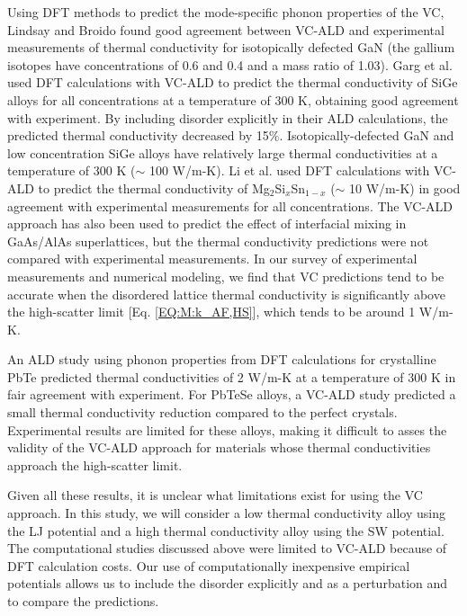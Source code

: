 Using DFT methods to predict 
the mode-specific phonon properties of the VC, Lindsay and Broido 
found good agreement between VC-ALD and experimental measurements of 
thermal conductivity for 
isotopically defected GaN (the gallium isotopes have concentrations of 
0.6 and 0.4 and a mass ratio of 1.03).\cite{lindsay_thermal_2012} 
Garg et al. used DFT calculations with VC-ALD   
to predict the thermal conductivity of SiGe alloys 
for all concentrations at a temperature of 300 K, 
obtaining good agreement with experiment.\cite{garg_role_2011}  
By including disorder explicitly in their ALD calculations, the predicted 
thermal conductivity decreased by 15$\%$. 
Isotopically-defected GaN and low concentration SiGe alloys 
have relatively large 
thermal conductivities at a temperature of 300 K ($\sim$ 100 W/m-K). 
Li et al. used DFT calculations with VC-ALD to predict the thermal 
conductivity of Mg$_2$Si$_x$Sn$_{1-x}$ ($\sim$ 10 W/m-K) 
in good agreement with 
experimental measurements for all concentrations.\cite{li_thermal_2012}
The VC-ALD approach has also been used to predict the effect of interfacial 
mixing in GaAs/AlAs superlattices, but the thermal 
conductivity predictions were not compared with experimental 
measurements.\cite{luckyanova_coherent_2012}  
In our survey of experimental measurements and numerical modeling, 
we find that 
VC predictions tend to be accurate when the disordered lattice 
thermal conductivity 
is significantly above the high-scatter limit [Eq. \eqref{EQ:M:k_AF,HS}],  
which tends to be around 1 W/m-K.
\cite{abeles_lattice_1963,kamitakahara_vibrations_1974,
cahill_thermal_2004,cahill_thermal_2005,cahill_lattice_1988,
garg_role_2011,lindsay_thermal_2012} 

An ALD study using phonon properties from DFT calculations for 
crystalline PbTe\cite{shiga_microscopic_2012} predicted 
thermal conductivities of 2 W/m-K at a temperature of 300 K 
in fair agreement with experiment. 
For PbTeSe alloys, a VC-ALD 
study predicted a small thermal conductivity reduction compared to the 
perfect crystals.\cite{tian_phonon_2012} Experimental results are limited 
for these alloys,\cite{kudman_thermoelectric_1972,pei_convergence_2011} 
making it difficult to asses the validity of the VC-ALD approach for 
materials whose thermal conductivities approach the high-scatter limit.

Given all these results, it is unclear what limitations exist for 
using the VC approach. 
In this study, we will consider a low thermal conductivity alloy  
using the LJ potential and a high thermal conductivity alloy using the 
SW potential. The computational studies discussed above were 
limited to VC-ALD 
because of DFT calculation costs. Our use of computationally 
inexpensive empirical potentials allows us to include the disorder 
explicitly and as a perturbation and to compare the predictions. 


